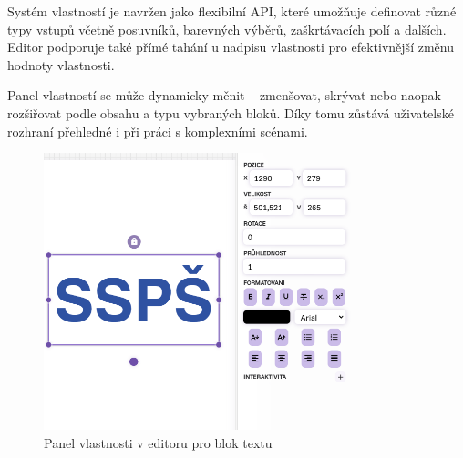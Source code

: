 Systém vlastností je navržen jako flexibilní API, které umožňuje definovat různé typy vstupů včetně posuvníků, barevných výběrů, zaškrtávacích polí a dalších. 
Editor podporuje také přímé tahání u nadpisu vlastnosti pro efektivnější změnu hodnoty vlastnosti.

Panel vlastností se může dynamicky měnit -- zmenšovat, skrývat nebo naopak rozšiřovat podle obsahu a typu vybraných bloků. 
Díky tomu zůstává uživatelské rozhraní přehledné i při práci s komplexními scénami.


\begin{figure}[ht!]
    \centering
    \includegraphics[width=0.8\textwidth]{media/05_realizace/vlastnosti.png}
    \caption{Panel vlastnosti v editoru pro blok textu}
    \label{fig:realizace/vlastnosti}
\end{figure}








